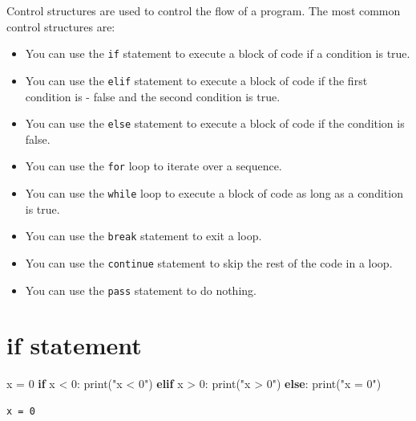 \documentclass[
  letterpaper,
  DIV=11,
  numbers=noendperiod]{scrreprt}
\newenvironment{Shaded}{\begin{snugshade}}{\end{snugshade}}
\newcommand{\BuiltInTok}[1]{\textcolor[rgb]{0.00,0.23,0.31}{#1}}
\newcommand{\ControlFlowTok}[1]{\textcolor[rgb]{0.00,0.23,0.31}{\textbf{#1}}}
\newcommand{\DecValTok}[1]{\textcolor[rgb]{0.68,0.00,0.00}{#1}}
\newcommand{\NormalTok}[1]{\textcolor[rgb]{0.00,0.23,0.31}{#1}}
\newcommand{\OperatorTok}[1]{\textcolor[rgb]{0.37,0.37,0.37}{#1}}
\newcommand{\StringTok}[1]{\textcolor[rgb]{0.13,0.47,0.30}{#1}}
\providecommand{\tightlist}{%
  \setlength{\itemsep}{0pt}\setlength{\parskip}{0pt}}\usepackage{longtable,booktabs,array}
\begin{document}

Control structures are used to control the flow of a program. The most
common control structures are:

\begin{itemize}
\tightlist
\item
  You can use the \texttt{if} statement to execute a block of code if a
  condition is true.
\item
  You can use the \texttt{elif} statement to execute a block of code if
  the first condition is - false and the second condition is true.
\item
  You can use the \texttt{else} statement to execute a block of code if
  the condition is false.
\item
  You can use the \texttt{for} loop to iterate over a sequence.
\item
  You can use the \texttt{while} loop to execute a block of code as long
  as a condition is true.
\item
  You can use the \texttt{break} statement to exit a loop.
\item
  You can use the \texttt{continue} statement to skip the rest of the
  code in a loop.
\item
  You can use the \texttt{pass} statement to do nothing.
\end{itemize}

\section*{if statement}\label{if-statement}


\begin{Shaded}
\begin{Highlighting}[]
\NormalTok{x }\OperatorTok{=} \DecValTok{0}
\ControlFlowTok{if}\NormalTok{ x }\OperatorTok{\textless{}} \DecValTok{0}\NormalTok{:}
    \BuiltInTok{print}\NormalTok{(}\StringTok{"x \textless{} 0"}\NormalTok{)}
\ControlFlowTok{elif}\NormalTok{ x }\OperatorTok{\textgreater{}} \DecValTok{0}\NormalTok{:}
    \BuiltInTok{print}\NormalTok{(}\StringTok{"x \textgreater{} 0"}\NormalTok{)}
\ControlFlowTok{else}\NormalTok{:}
    \BuiltInTok{print}\NormalTok{(}\StringTok{"x = 0"}\NormalTok{)}
\end{Highlighting}
\end{Shaded}

\begin{verbatim}
x = 0
\end{verbatim}
\end{document}
